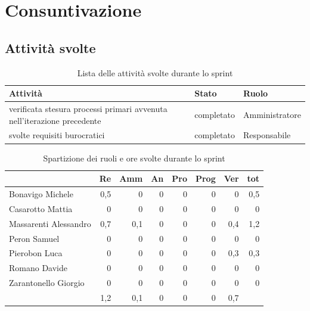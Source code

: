 \section{Consuntivazione}

\subsection{Attività svolte}

\begin{table}[ht]
    \begin{tabularx}{\textwidth}{X l l}
        
        \rowcolor{gray!30} \textbf{Attività} & \textbf{Stato} & \textbf{Ruolo}\\
        
        \hline
        verificata stesura processi primari avvenuta nell'iterazione precedente & completato & Amministratore\\
        svolte requisiti burocratici & completato & Responsabile\\
        \end{tabularx}
    \caption{Lista delle attività svolte durante lo sprint}
\end{table}


\begin{table}[ht]
    \begin{tabularx}{\linewidth}{X|rrrrrrr}
    \rowcolor{gray!30}& Re & Amm & An & Pro & Prog & Ver & tot \\
    \hline
    Bonavigo Michele                        & 0,5 & 0 & 0 & 0 & 0 & 0  & 0,5 \\
    \rowcolor{gray!10}Casarotto Mattia      & 0 & 0 & 0 & 0 & 0 & 0 & 0 \\
    Massarenti Alessandro                   & 0,7 & 0,1 & 0 & 0 & 0 & 0,4  & 1,2 \\
    \rowcolor{gray!10}Peron Samuel          & 0 & 0 & 0 & 0 & 0 & 0 & 0 \\
    Pierobon Luca                           & 0 & 0 & 0 & 0 & 0 & 0,3 & 0,3 \\
    \rowcolor{gray!10}Romano Davide         & 0 & 0 & 0 & 0 & 0 & 0 & 0 \\
    Zarantonello Giorgio                    & 0 & 0 & 0 & 0 & 0 & 0 & 0 \\
    \hline                                  & 1,2 & 0,1 & 0 & 0 & 0 & 0,7 & \\ 
    \end{tabularx}
    \caption{\label{ruoli-persone}Spartizione dei ruoli e ore svolte durante lo sprint}
\end{table}

